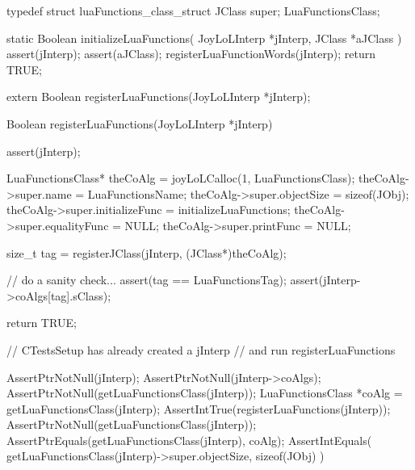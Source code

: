 \stoptyping

\startTestSuite[registerLuaFunctions]

\startCHeader
typedef struct luaFunctions_class_struct {
  JClass super;
} LuaFunctionsClass;
\stopCHeader

\startCCode
static Boolean initializeLuaFunctions(
  JoyLoLInterp *jInterp,
  JClass   *aJClass
) {
  assert(jInterp);
  assert(aJClass);
  registerLuaFunctionWords(jInterp);
  return TRUE;
}
\stopCCode

\startCHeader
extern Boolean registerLuaFunctions(JoyLoLInterp *jInterp);
\stopCHeader
{}

\startCCode
Boolean registerLuaFunctions(JoyLoLInterp *jInterp) {
  assert(jInterp);
  
  LuaFunctionsClass* theCoAlg =
    joyLoLCalloc(1, LuaFunctionsClass);
  theCoAlg->super.name           = LuaFunctionsName;
  theCoAlg->super.objectSize     = sizeof(JObj);
  theCoAlg->super.initializeFunc = initializeLuaFunctions;
  theCoAlg->super.equalityFunc   = NULL;
  theCoAlg->super.printFunc      = NULL;
  
  size_t tag =
    registerJClass(jInterp, (JClass*)theCoAlg);

  // do a sanity check...
  assert(tag == LuaFunctionsTag);
  assert(jInterp->coAlgs[tag].sClass);
  
  return TRUE;
}
\stopCCode


\startCTest
  // CTestsSetup has already created a jInterp
  // and run registerLuaFunctions
  
  AssertPtrNotNull(jInterp);
  AssertPtrNotNull(jInterp->coAlgs);
  AssertPtrNotNull(getLuaFunctionsClass(jInterp));
  LuaFunctionsClass *coAlg =
    getLuaFunctionsClass(jInterp);
  AssertIntTrue(registerLuaFunctions(jInterp));
  AssertPtrNotNull(getLuaFunctionsClass(jInterp));
  AssertPtrEquals(getLuaFunctionsClass(jInterp), coAlg);
  AssertIntEquals(
    getLuaFunctionsClass(jInterp)->super.objectSize,
    sizeof(JObj)
  )
\stopCTest
\stopTestCase
\stopTestSuite
